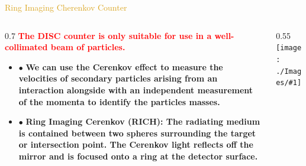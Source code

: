 \documentclass[11pt]{beamer} %
\renewcommand{\(}{\begin{columns}}
\renewcommand{\)}{\end{columns}}
\newcommand{\<}[1]{\begin{column}{#1}}
\renewcommand{\>}{\end{column}}
\newcommand{\itt}{\begin{itemize}}
\newcommand{\tti}{\end{itemize}}
\newcommand{\img}[1]{\texttt{[image: ./Images/\#1]}}
\newcommand{\hlt}[2]{\textcolor{#1}{\textbf{#2}}}
\begin{document}
\begin{frame}{\textcolor{Goldenrod}{Ring Imaging Cherenkov Counter}}
  \(
  \<{0.7\textwidth}
  \hlt{Red}{The DISC counter is only suitable for use in a well-collimated beam of
  particles.}

\itt
\item[$\bullet$] \hlt{JungleGreen}{We can use the Cerenkov effect to
    measure the velocities of secondary particles arising from an
    interaction alongside with an independent measurement of the momenta
    to identify the particles masses.}
  
\item[$\bullet$] \hlt{NavyBlue}{Ring Imaging Cerenkov (RICH):
    The radiating medium is contained
    between two spheres surrounding the target or intersection point. The
    Cerenkov light reflects off the mirror and is focused onto a ring at
    the detector surface.}
  \tti
  \>
  \<{0.55\textwidth}
  \img{RICH_counters_02}
  \>
  \)
\end{frame} 

\end{document}

